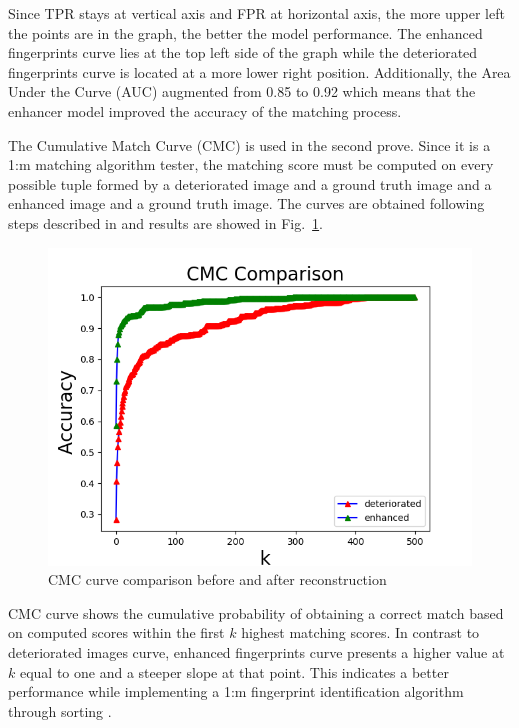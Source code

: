 \documentclass[a4paper,fleqn]{cas-dc}
\begin{document}
Since TPR stays at vertical axis and FPR at horizontal axis, the more upper left the points are in the graph, the better the model performance. The enhanced fingerprints curve lies at the top left side of the graph while the deteriorated fingerprints curve is located at a more lower right position. Additionally, the Area Under the Curve (AUC) augmented from 0.85 to 0.92 which means that the enhancer model improved the accuracy of the matching process.

The Cumulative Match Curve (CMC) is used in the second prove. Since it is a 1:m matching algorithm tester, the matching score must be computed on every possible tuple formed by a deteriorated image and a ground truth image and a enhanced image and a ground truth image. The curves are obtained following steps described in \cite{RROCCMC} and results are showed in Fig.~\ref{fig10}.

\begin{figure}[htbp]
\centerline{\includegraphics[scale=0.45]{figs/cmc_comparison.png}}
\caption{CMC curve comparison before and after reconstruction}
\label{fig10}
\end{figure}

CMC curve shows the cumulative probability of obtaining a correct match based on computed scores within the first $k$ highest matching scores. In contrast to deteriorated images curve, enhanced fingerprints curve presents a higher value at $k$ equal to one and a steeper slope at that point. This indicates a better performance while implementing a 1:m fingerprint identification algorithm through sorting \cite{RROCCMC}.
\end{document}
